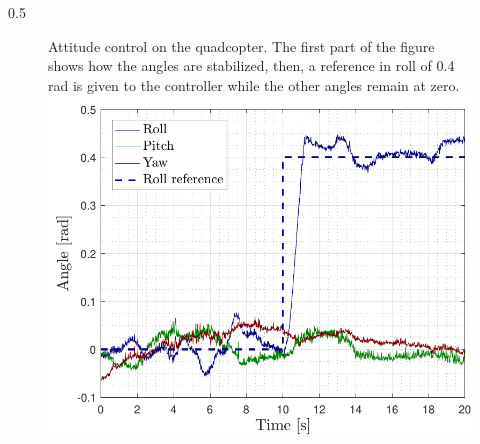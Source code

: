 \vspace{-2cm}
\begin{columns}[t,totalwidth=\twocolwid] %
		
		\begin{column}{0.5\twocolwid}%
        \vspace{2cm}
  		\centering
			\begin{figure}
                 \captionbox
                 {Attitude control on the quadcopter. The first part of the figure shows how the angles are stabilized, then, a reference in roll of 0.4 rad is given to the controller while the other angles remain at zero.}
				{
                    \includegraphics[width=.9\linewidth]{figures/AttitudeControl}
				}
			\end{figure}
		\end{column} %
		

\end{columns}
